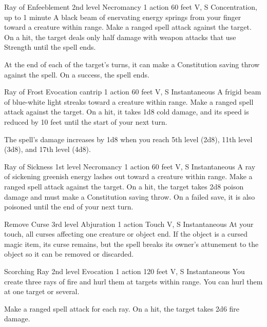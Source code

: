 \documentclass[10pt,a4paper,twoside,bg=print,twocolumn,openany,nodeprecatedcode]{dndbook}
\begin{document}


\DndSpellHeader%
{Ray of Enfeeblement}
{2nd level Necromancy}
{1 action}
{60 feet}
{V, S}
{Concentration, up to 1 minute}
A black beam of enervating energy springs from your finger toward a creature within range. Make a ranged spell attack against the target. On a hit, the target deals only half damage with weapon attacks that use Strength until the spell ends.

At the end of each of the target's turns, it can make a Constitution saving throw against the spell. On a success, the spell ends.



\DndSpellHeader%
{Ray of Frost}
{Evocation cantrip}
{1 action}
{60 feet}
{V, S}
{Instantaneous}
A frigid beam of blue-white light streaks toward a creature within range. Make a ranged spell attack against the target. On a hit, it takes 1d8 cold damage, and its speed is reduced by 10 feet until the start of your next turn.

The spell's damage increases by 1d8 when you reach 5th level (2d8), 11th level (3d8), and 17th level (4d8).



\DndSpellHeader%
{Ray of Sickness}
{1st level Necromancy}
{1 action}
{60 feet}
{V, S}
{Instantaneous}
A ray of sickening greenish energy lashes out toward a creature within range. Make a ranged spell attack against the target. On a hit, the target takes 2d8 poison damage and must make a Constitution saving throw. On a failed save, it is also poisoned until the end of your next turn.



\DndSpellHeader%
{Remove Curse}
{3rd level Abjuration}
{1 action}
{Touch}
{V, S}
{Instantaneous}
At your touch, all curses affecting one creature or object end. If the object is a cursed magic item, its curse remains, but the spell breaks its owner's attunement to the object so it can be removed or discarded.



\DndSpellHeader%
{Scorching Ray}
{2nd level Evocation}
{1 action}
{120 feet}
{V, S}
{Instantaneous}
You create three rays of fire and hurl them at targets within range. You can hurl them at one target or several.

Make a ranged spell attack for each ray. On a hit, the target takes 2d6 fire damage.
\end{document}
